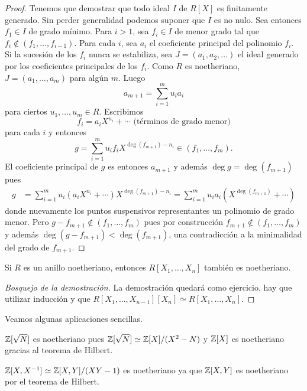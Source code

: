 \begin{proof}
	Tenemos que demostrar que todo ideal $I$ de $R[X]$ es finitamente generado. Sin perder generalidad podemos suponer que
	$I$ es no nulo. Sea entonces $f_1\in I$ de grado mínimo. Para $i>1$, 
	sea $f_i\in I$ de menor grado tal que $f_i\not\in (f_1,\dots,f_{i-1})$. Para cada $i$, sea $a_i$ el coeficiente principal del polinomio $f_i$. 
	Si la sucesión de los $f_i$ 	nunca se estabiliza, sea $J=(a_1,a_2,\dots)$ el ideal generado por los coeficientes principales de los $f_i$.  Como $R$ es noetheriano, 
	$J=(a_1,\dots,a_m)$ para algún $m$. Luego
	\[
	a_{m+1}=\sum_{i=1}^m u_ia_i
	\]
	para ciertos $u_1,\dots,u_m\in R$. Escribimos 
	\[
	f_i=a_iX^{n_i}+\cdots\text{ (términos de grado menor)} 
	\]
	para cada $i$ y entonces
	\[
	g=\sum_{i=1}^m u_if_iX^{\deg(f_{m+1})-n_i}\in (f_1,\dots,f_m).
	\]
	El coeficiente principal de $g$ es entonces $a_{m+1}$ y además $\deg g=\deg(f_{m+1})$ pues
	\begin{align*}
	g&=\sum_{i=1}^m u_i(a_iX^{n_i}+\cdots)X^{\deg(f_{m+1})-n_i}
	=\sum_{i=1}^m u_ia_i(X^{\deg(f_{m+1})}+\cdots)
\end{align*}
	donde nuevamente los puntos suspensivos representantes un polinomio de grado menor. 
	Pero $g-f_{m+1}\not\in(f_1,\dots,f_m)$ pues por construcción $f_{m+1}\not\in (f_1,\dots,f_m)$ y además $\deg(g-f_{m+1})<\deg(f_{m+1})$, una contradicción
	a la minimalidad del grado de $f_{m+1}$. 
\end{proof}

\begin{corollary}
	Si $R$ es un anillo noetheriano, entonces $R[X_1,\dots,X_n]$ también es noetheriano.
\end{corollary}

\begin{proof}[Bosquejo de la demostración]
La demostración quedará como ejercicio, hay que utilizar inducción y que $R[X_1,\dots,X_{n-1}][X_n]\simeq R[X_1,\dots,X_n]$.  	
\end{proof}

Veamos algunas aplicaciones sencillas.

\begin{example}
$\mathbb{Z}[\sqrt{N}]$ es noetheriano pues $\mathbb{Z}[\sqrt{N}]\simeq\mathbb{Z}[X]/(X^2-N)$ y $\mathbb{Z}[X]$ es noetheriano gracias al teorema de Hilbert.	
\end{example}

\begin{example}
$\mathbb{Z}[X,X^{-1}]\simeq\mathbb{Z}[X,Y]/(XY-1)$ es noetheriano ya que $\mathbb{Z}[X,Y]$ es noetheriano por el teorema de Hilbert. 	
\end{example}


